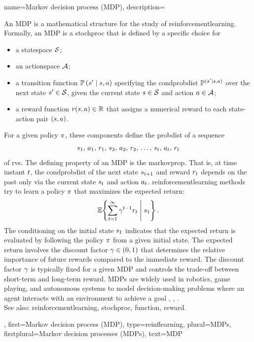 {name={Markov decision process (MDP)},
	description={An MDP is a mathematical 
	        structure for the study of \gls{reinforcementlearning}. 
		Formally, an MDP is a \gls{stochproc} that is defined by a specific choice for 
		\begin{itemize}
    			\item a \gls{statespace} $\mathcal{S}$;
    			\item an \gls{actionspace} $\mathcal{A}$;
    			\item a transition \gls{function} $\mathbb{P}\left(s' \mid s, a\right)$ 
				specifying the \gls{condprobdist} $\mathbb{P}^{(s' \mid s, a)}$
				over the next \gls{state} $s' \in \mathcal{S}$, given the current \gls{state} 
				$s \in \mathcal{S}$ and \gls{action} $a \in \mathcal{A}$;
    			\item a \gls{reward} \gls{function} $r(s, a) \in \mathbb{R}$ 
				that assigns a numerical \gls{reward} to each \gls{state}-\gls{action}
				pair $(s,a)$.
		\end{itemize}
		For a given \gls{policy} $\pi$, these components define the \gls{probdist} of a \gls{sequence}
		$$ s_{1},\,a_{1},\,r_{1},\,s_{2},\,a_{2},\,r_{2},\,\ldots,\,s_{t},\,a_{t},\,r_{t}$$ 
		of \glspl{rv}. The defining property of an MDP is the \gls{markovprop}. 
		That is, at time instant $t$, the \gls{condprobdist} of the next \gls{state} 
		$s_{t+1}$ and \gls{reward} $r_{t}$ depends on the 
		past only via the current \gls{state} $s_{t}$ and \gls{action} $a_{t}$. 
		\Gls{reinforcementlearning} methods try to learn a \gls{policy} $\pi$ that 
		maximizes the expected return:
		\[
			\mathbb{E}\!\left\{ 
			 \sum_{t=1}^{\infty} 
			 \gamma^{t-1} r_{t} 
			 \;\middle|\; s_{1} 
			 \right\}. 
		\]
		The conditioning on the initial \gls{state} $s_{1}$ indicates that the expected 
		return is evaluated by following the \gls{policy} $\pi$ from a given initial \gls{state}.
		The expected return involves the discount factor $\gamma \in (0,1)$ 
		that determines the relative importance of future \glspl{reward} compared 
		to the immediate \gls{reward}. 
		The discount factor $\gamma$ is typically fixed for a given MDP and 
		controls the trade-off between short-term and long-term \gls{reward}. 
		MDPs are widely used in robotics, game playing, and autonomous systems to model 
		decision-making problems where an \gls{agent} interacts with an \gls{environment} to 
		achieve a goal \cite{SuttonEd2}, \cite{BertsekasDynOptII}, \cite{BertsekasDynProgVolI}.
		\\
		See also: \gls{reinforcementlearning}, \gls{stochproc}, \gls{function}, \gls{reward}.},
 	first={Markov decision process (MDP)},
	type=reinflearning, 
	plural={MDPs}, 
	firstplural={Markov decision processes (MDPs)}, 
 	text={MDP} 
}

